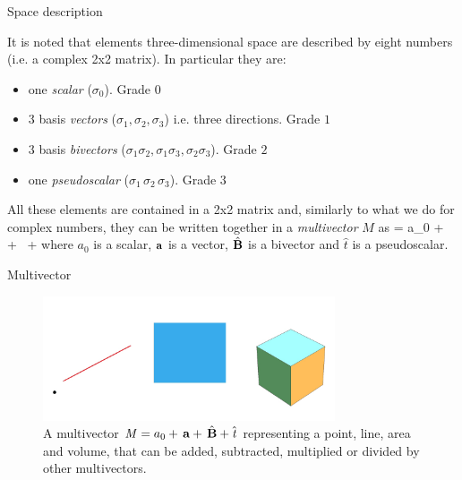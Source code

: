 \documentclass[10pt]{beamer}
\begin{document}
\begin{frame}[fragile]{Space description}


It is noted that elements  three-dimensional space are described by eight numbers (i.e. a complex 2x2 matrix). In particular they are: 
\begin{itemize}
\item one \emph{scalar} ($\sigma_0$). Grade $0$
\item 3 basis \emph{vectors} ($\sigma_1, \sigma_2, \sigma_3$) i.e. three directions. Grade $1$
\item 3 basis \emph{bivectors} ($\sigma_1 \sigma_2, \sigma_1 \sigma_3, \sigma_2 \sigma_3$). Grade $2$
\item one \emph{pseudoscalar} ($\sigma_1 \, \sigma_2 \, \sigma_3$). Grade $3$
\end{itemize}
%
All these elements are contained in a 2x2 matrix and, similarly to what we do for complex numbers, they can be written together in a 
\alert{ \emph{multivector} $\mathit{M}$} as
\be \label{Mmultivector}
 = 
a_0 + \, \Ba + \, \hat{\BB} +  
\ee
where $a_0$ is a scalar, $\mathbf{a}$ is a vector, $\hat{\mathbf{B}}$ is a bivector and $\hat{\mathit{t}}$ is a pseudoscalar.

\end{frame}

\begin{frame}[fragile]{Multivector}

\begin{figure}[htb]

\begin{center}
\includegraphics[width=3.4in]{Multi}
\end{center}

\caption{A multivector $\mathit{M} = 
a_0 + \, \mathbf{a} + \, \hat{\mathbf{B}} +  \hat{\mathit{t}}$ representing a point, line, area and volume, that can be added, subtracted, multiplied or divided by other multivectors. \label{MultiPic}}

\end{figure}


\end{frame}
\end{document}
